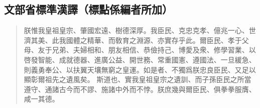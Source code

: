 \documentclass{report}
\begin{document}
\subsection{\ja 文部省標準漢譯（標點係編者所加）}
\begin{quote}
    \hant 朕惟我皇祖皇宗、肇國宏遠、樹德深厚。我臣民、克忠克孝、億兆一心、世濟其美、此我國體之精華、而敎育之淵源、亦實存乎此。爾臣民、孝于父母、友于兄弟、夫婦相和、朋友相信、恭儉持己、博愛及衆、修學習業、以啓發智能、成就德器、進廣公益、開世務、常重國憲、遵國法、一旦緩急、則義勇奉公、以扶翼天壤無窮之皇運。如是者、不獨爲朕忠良臣民、又足以顯彰爾祖先之遺風矣。
    斯道也、實我皇祖皇宗之遺訓、而子孫臣民之所當遵守、通諸古今而不謬、施諸中外而不悖。朕庶幾與爾臣民、俱拳拳服膺、咸一其德。
\end{quote}
\end{document}
